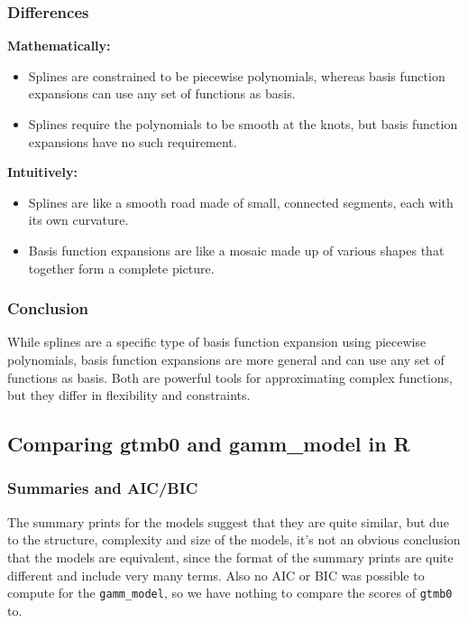 \subsubsection{Differences}

\textbf{Mathematically:}
\begin{itemize}
    \item Splines are constrained to be piecewise polynomials, whereas basis function expansions can use any set of functions as basis.
    \item Splines require the polynomials to be smooth at the knots, but basis function expansions have no such requirement.
\end{itemize}

\textbf{Intuitively:}
\begin{itemize}
    \item Splines are like a smooth road made of small, connected segments, each with its own curvature.
    \item Basis function expansions are like a mosaic made up of various shapes that together form a complete picture.
\end{itemize}

\subsubsection{Conclusion}

While splines are a specific type of basis function expansion using piecewise polynomials, basis function expansions are more general and can use any set of functions as basis. Both are powerful tools for approximating complex functions, but they differ in flexibility and constraints.
\subsection{Comparing gtmb0 and gamm\_model in R}

\subsubsection{Summaries and AIC/BIC}

The summary prints for the models suggest that they are quite similar, but due to the structure, complexity and size of the models, it's not an obvious conclusion that the models are equivalent, since the format of the summary prints are quite different and include very many terms. 
\newline
Also no AIC or BIC was possible to compute for the \texttt{gamm\_model}, so we have nothing to compare the scores of \texttt{gtmb0} to. 


